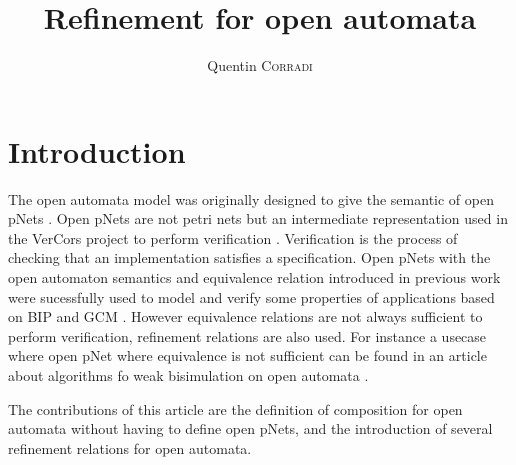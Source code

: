 \documentclass{article}
\title{Refinement for open automata}
\author{Quentin \textsc{Corradi}}
\begin{document}
\maketitle

\section{Introduction}
The open automata model was originally designed to give the semantic of open pNets \cite{2007.10770}.
Open pNets are not petri nets but an intermediate representation used in the VerCors project to perform verification \cite{henrio:01252323}.
 Verification is the process of checking that an implementation satisfies a specification.
Open pNets with the open automaton semantics and equivalence relation introduced in previous work \cite{2007.10770} were sucessfully used to model and verify some properties of applications based on BIP  and GCM \cite{qin:01823507, ameurboulifa:01526055} .
However equivalence relations are not always sufficient to perform verification, refinement relations are also used. 
For instance a usecase where open pNet where equivalence is not sufficient can be found  in an article about algorithms fo weak bisimulation on open automata \cite{wang:03126313}.



The contributions of this article are  the definition of composition for open automata without having to define open pNets, and the introduction of several refinement relations for open automata. %



\end{document}

